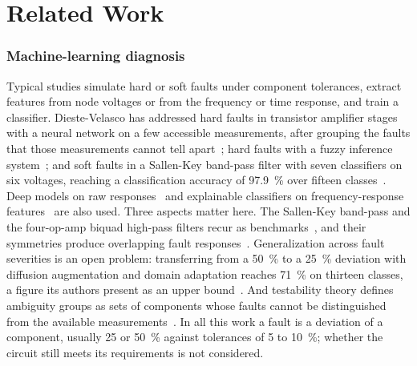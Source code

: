 \section{Related Work}
\label{sec:related}

\subsubsection*{Machine-learning diagnosis}
Typical studies simulate hard or soft faults under component tolerances, extract features from
node voltages or from the frequency or time response, and train a classifier. Dieste-Velasco has
addressed hard faults in transistor amplifier stages with a neural network on a few accessible
measurements, after grouping the faults that those measurements cannot tell
apart~\cite{dieste2021}; hard faults with a fuzzy inference system~\cite{dieste2024}; and soft
faults in a Sallen-Key band-pass filter with seven classifiers on six voltages, reaching a
classification accuracy of \SI{97.9}{\percent} over fifteen classes~\cite{dieste2025}. Deep
models on raw responses~\cite{yang2020} and explainable classifiers on frequency-response
features~\cite{rajpal2026} are also used. Three aspects matter here. The Sallen-Key band-pass and
the four-op-amp biquad high-pass filters recur as
benchmarks~\cite{dieste2025,chen2025,zhang2026,srimani2022}, and their symmetries produce
overlapping fault responses~\cite{chen2025}. Generalization across fault severities is an open
problem: transferring from a \SI{50}{\percent} to a \SI{25}{\percent} deviation with diffusion
augmentation and domain adaptation reaches \SI{71}{\percent} on thirteen classes, a figure its
authors present as an upper bound~\cite{zhang2026}. And testability theory defines ambiguity
groups as sets of components whose faults cannot be distinguished from the available
measurements~\cite{starzyk2000}. In all this work a fault is a deviation of a component, usually
25 or \SI{50}{\percent} against tolerances of 5 to \SI{10}{\percent}; whether the circuit still
meets its requirements is not considered.

